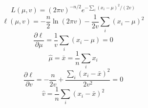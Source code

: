 \documentclass{article}
\begin{document}
\[
L(\mu,v)=(2\pi v)^{-n/2}e^{-\sum_i(x_i-\mu)^2/(2v)}
\]
\[
\ell(\mu,v)=-\frac{n}{2}\ln(2\pi v)-\frac{1}{2v}\sum_i(x_i-\mu)^2
\]
\[
\frac{\partial\ell}{\partial\mu}=\frac{1}{v}\sum_i(x_i-\mu)=0
\]
\[
\hat\mu=\bar x=\frac{1}{n}\sum_i x_i
\]
\[
\frac{\partial\ell}{\partial v}=-\frac{n}{2v}+\frac{\sum_i(x_i-\bar x)^2}{2v^2}=0
\]
\[
\hat v=\frac{1}{n}\sum_i(x_i-\bar x)^2
\]
\end{document}

